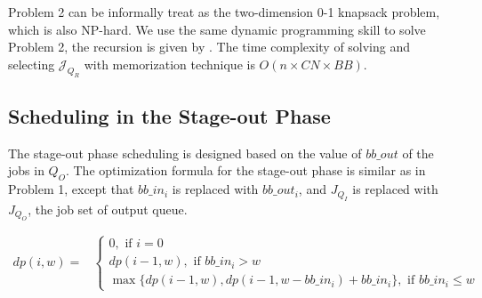Problem 2 can be informally treat as the two-dimension 0-1 knapsack problem, which is also NP-hard.
We use the same dynamic programming skill to solve Problem 2, the recursion is given by .
The time complexity of solving  and selecting $\mathcal{J}_{Q_R}$ with memorization technique is $O(n\times CN\times BB)$.


\subsection{Scheduling in the Stage-out Phase}
\label{SubSec:OptStageOut}

The stage-out phase scheduling is designed based on the value of $bb\_out$ of the jobs in $Q_O$.
The optimization formula for the stage-out phase is similar as in Problem 1, 
except that $bb\_in_i$ is replaced with $bb\_out_i$, 
and $J_{Q_I}$ is replaced with $J_{Q_O}$, the job set of output queue.

%
%


\begin{strip}
        \begin{align}
                dp(i, w) = & 
                \left\{
                        \begin{array}{l}
                                0, \text{ if $i=0$ } \\ [0.6em]
                                dp(i-1, w), \text{ if $bb\_in_i > w$} \\ [0.6em]
                                \max \{ dp(i-1, w), dp(i-1, w-bb\_in_i) + bb\_in_i \}, \text{ if $bb\_in_i \leq w$}
                        \end{array} 
                \right.
                \label{Equ:MaxTransferDataRecursion} 
        \end{align}
\end{strip}

